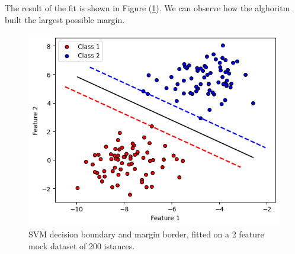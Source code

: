 \documentclass[a4paper]{article}
\begin{document}
The result of the fit is shown in Figure (\ref{fig:classical svm mock}). We can observe how the alghoritm built the largest possible margin. 


\begin{figure}[h!]
    \centering
    \includegraphics[width=\textwidth]{images/classicalsvm.png}
    \caption{SVM decision boundary and margin border, fitted on a 2 feature mock dataset of 200 istances.}
    \label{fig:classical svm mock}
\end{figure}
\end{document}

